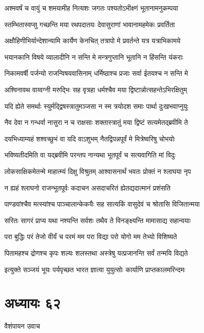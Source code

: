 \twolineshloka
{अश्मवर्षं च वायुं च शमयामीह नित्यशः}
{जगतः पश्यतोऽभीक्ष्णं भूतानामनुकम्पया}


\twolineshloka
{स्तम्भितास्वप्सु गच्छन्ति मया रथपदातयः}
{देवासुराणां भावानामहमेकः प्रवर्तिता}


\twolineshloka
{अक्षौहिणीभिर्यान्देशान्यामि कार्येण केनचित्}
{तत्रापो मे प्रवर्तन्ते यत्र यत्राभिकामये}


\twolineshloka
{भयानकानि विषये व्यालादीनि न सन्ति मे}
{मन्त्रगुप्तानि भूतानि न हिंसन्ति यंकराः}


\twolineshloka
{निकामवर्षी पर्जन्यो राजन्विषयवासिनाम्}
{धर्मिष्ठाश्च प्रजाः सर्वा ईतयश्च न सन्ति मे}


\twolineshloka
{अश्विनावथ वाय्वग्नी मरुद्भिः सह वृत्रहा}
{धर्मश्चैव मया द्विष्टान्नोत्सहन्तेऽभिरक्षितुम्}


\twolineshloka
{यदि ह्येते समर्थाः स्युर्मद्द्विषस्त्रातुमञ्जसा}
{न स्म त्रयोदश समाः पार्था दुःखभवाप्नुयुः}


\twolineshloka
{नैव देवा न गन्धर्वा नासुरा न च राक्षसाः}
{शक्तास्त्रातुं मया द्विष्टं सत्यमेतद्ब्रवीमि ते}


\twolineshloka
{दयभिध्याम्यहं शश्वच्छुभं वा यदि वाऽशुभम्}
{नैतद्विपन्नपूर्वं मे मित्रेष्वरिषु चोभयोः}


\twolineshloka
{भविष्यतीदमिति वा यद्ब्रवीमि परन्तप}
{नान्यथा भूतपूर्वं च सत्यवागिति मां विदुः}


\twolineshloka
{लोकसाक्षिकमेतन्मे माहात्म्यं दिक्षु विश्रुतम्}
{आश्वासनार्थं भवतः प्रोक्तं न श्लाघया नृप}


\twolineshloka
{न ह्यहं श्लाघनो राजन्भूतपूर्वः कदाचन}
{असदाचरितं ह्येतद्यदात्मानं प्रशंसति}


\twolineshloka
{पाण्डवांश्चैव मत्स्यांश्च पाञ्चालान्केकयैः सह}
{सात्यकिं वासुदेवं च श्रोतासि विजितान्मया}


\twolineshloka
{सरितः सागरं प्राप्य यथा नश्यन्ति सर्वशः}
{तथैव ते विनङ्क्ष्यन्ति मामासाद्य सहान्वयाः}


\twolineshloka
{परा बुद्धिः परं तेजो वीर्यं च परमं मम}
{परा विद्या परो योगो मम तेभ्यो विशिष्यते}


\twolineshloka
{पितामहश्च द्रोणश्च कृपः शल्यः शलस्तथा}
{अस्त्रेषु यत्प्रजानन्ति सर्वं तन्मयि विद्यते}


\twolineshloka
{इत्युक्ते सञ्जयं भूयः पर्यपृच्छत भारत}
{ज्ञात्वा युयुत्सोः कार्याणि प्राप्तकालमरिन्दमः}


\chapter{अध्यायः ६२}
\twolineshloka
{वैशंपायन उवाच}
{}


